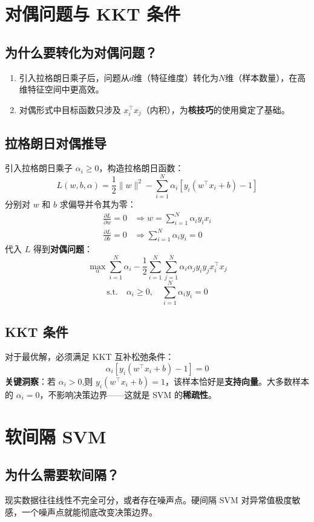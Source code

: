 \documentclass[12pt, a4paper]{book}
\begin{document}
\section{对偶问题与 KKT 条件}

\subsection{为什么要转化为对偶问题？}
\begin{enumerate}
    \item 引入拉格朗日乘子后，问题从$d$维（特征维度）转化为$N$维（样本数量），在高维特征空间中更高效。
    \item 对偶形式中目标函数只涉及 $x_i^\top x_j$（内积），为\textbf{核技巧}的使用奠定了基础。
\end{enumerate}

\subsection{拉格朗日对偶推导}
引入拉格朗日乘子 $\alpha_i \geq 0$，构造拉格朗日函数：
$$ L(w, b, \alpha) = \frac{1}{2}\|w\|^2 - \sum_{i=1}^N \alpha_i \left[ y_i(w^\top x_i + b) - 1 \right] $$
分别对 $w$ 和 $b$ 求偏导并令其为零：
\begin{align}
\frac{\partial L}{\partial w} = 0 &\Rightarrow w = \sum_{i=1}^N \alpha_i y_i x_i \\
\frac{\partial L}{\partial b} = 0 &\Rightarrow \sum_{i=1}^N \alpha_i y_i = 0
\end{align}
代入 $L$ 得到\textbf{对偶问题}：
$$ \max_\alpha \sum_{i=1}^N \alpha_i - \frac{1}{2} \sum_{i=1}^N \sum_{j=1}^N \alpha_i \alpha_j y_i y_j x_i^\top x_j $$
$$ \text{s.t.} \quad \alpha_i \geq 0, \quad \sum_{i=1}^N \alpha_i y_i = 0 $$

\subsection{KKT 条件}
对于最优解，必须满足 KKT 互补松弛条件：
$$ \alpha_i \left[ y_i(w^\top x_i + b) - 1 \right] = 0 $$
\textbf{关键洞察}：若 $\alpha_i > 0$,则 $y_i(w^\top x_i + b) = 1$，该样本恰好是\textbf{支持向量}。大多数样本的 $\alpha_i = 0$，不影响决策边界——这就是 SVM 的\textbf{稀疏性}。

\section{软间隔 SVM}

\subsection{为什么需要软间隔？}
现实数据往往线性不完全可分，或者存在噪声点。硬间隔 SVM 对异常值极度敏感，一个噪声点就能彻底改变决策边界。
\end{document}
